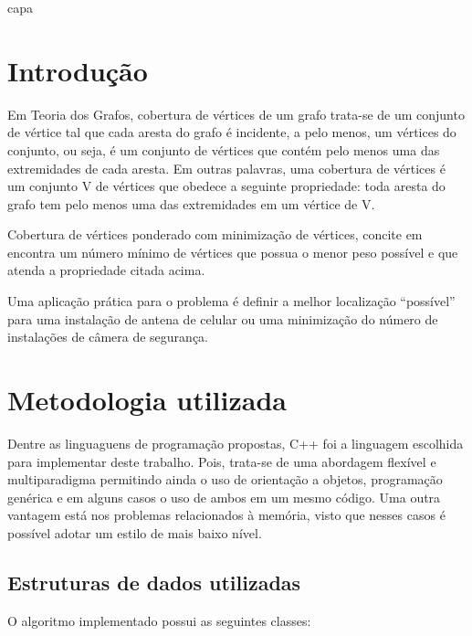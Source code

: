 \documentclass[12pt, fleqn]{article}
\begin{document}
    \pagestyle {empty}

     {capa}    
    
    \pagestyle {empty}
    
    \newpage

    \pagestyle {plain}

    \setcounter{page}{0} 
    
    \setlength{\parindent}{0in}  
    
    \parskip 5pt  

    \section{Introdução}

      \quad Em Teoria dos Grafos, cobertura de vértices de um grafo trata-se de um conjunto de vértice tal que cada aresta do grafo é incidente, a pelo menos, 
	   um vértices do conjunto, ou seja, é um conjunto de vértices que contém pelo menos uma das extremidades de cada aresta. 
	   Em outras palavras, uma cobertura de vértices é um conjunto V de vértices que obedece a seguinte propriedade: toda aresta do grafo tem pelo menos uma das extremidades em um vértice de V.
      
      \quad Cobertura de vértices ponderado com minimização de vértices, concite em encontra um número mínimo de vértices que possua o menor peso possível e que  atenda a propriedade citada acima.      
      
      \quad Uma aplicação prática para o problema é definir a melhor localização “possível” para uma instalação de antena de celular ou uma minimização do número de instalações de câmera de segurança.


    \section{Metodologia utilizada}
      \quad Dentre as linguaguens de programação propostas, C++ foi a linguagem escolhida para implementar deste trabalho. 
	Pois, trata-se de uma abordagem flexível e multiparadigma permitindo ainda o uso de orientação a objetos, programação genérica e em alguns casos o uso de ambos em um mesmo código. 
	Uma outra vantagem está nos problemas relacionados à memória, visto que nesses casos é possível adotar um estilo de mais baixo nível.


      \subsection{Estruturas de dados utilizadas}	
	\quad O algoritmo implementado possui as seguintes classes: 
	
\end{document}
